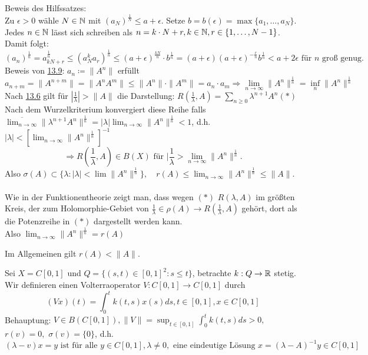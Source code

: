 \begin{beweis}
	Beweis des Hilfssatzes: \\
	Zu $\epsilon > 0$ wähle $N \in \mathbb{N}$ mit $(a_{N})^{\frac{1}{N}} \leq a + \epsilon$. Setze $b = b(\epsilon) = \max \{ a_{1}, \dotsc, a_{N} \}$. \\
	Jedes $n \in \mathbb{N}$ lässt sich schreiben als $n = k \cdot N + r, k \in \mathbb{N}, r \in \{ 1, \dotsc, N - 1 \}$. \\
	Damit folgt:
		\[ (a_{n})^{\frac{1}{n}} = a_{k N + r}^{\frac{1}{n}} \leq (a_{N}^{k} a_{r})^{\frac{1}{n}} \leq (a + \epsilon)^{\frac{k N}{n}} \cdot b^{\frac{1}{n}} = (a + \epsilon)(a + \epsilon)^{- \frac{r}{n}} b^{\frac{1}{n}} < a + 2 \epsilon \text{ für } n \text{ gro{\ss} genug.} \]
	Beweis von \hyperref[satz:13.9]{13.9}: $a_{n} \coloneqq \| A^{n} \|$ erfüllt
	 \[ a_{n + m} = \| A^{n + m} \| = \| A^{n} A^{m} \| \leq \|A^{n}\| \cdot \|A^{m}\| = a_{n} \cdot a_{m} \Rightarrow \lim_{n \rightarrow \infty} \| A^{n} \|^{\frac{1}{n}} = \inf_{n} \| A^{n} \|^{\frac{1}{n}} \]
	Nach \hyperref[satz:13.6]{13.6} gilt für $\left| \frac{1}{\lambda} \right| > \| A \|$ die Darstellung: $R(\frac{1}{\lambda}, A) = \sum_{n \geq 0} \lambda^{n +1} A^{n} (*) \label{eq:13.9.5-*}$ \\ 
	Nach dem Wurzelkriterium konvergiert diese Reihe falls $\overline{\lim_{n \rightarrow \infty}} \| \lambda^{n + 1} A^{n} \|^{\frac{1}{n}} = |\lambda| \lim_{n \rightarrow \infty} \| A^{n} \|^{\frac{1}{n}} < 1$, d.h. $| \lambda | < \left[ \lim_{n \rightarrow \infty} \| A^{n} \|^{\frac{1}{n}} \right]^{-1}$
	\[ \Rightarrow R( \frac{1}{\lambda}, A) \in B(X) \text{ für } |\frac{1}{\lambda} > \lim_{n \rightarrow \infty} \| A^{n} \|^{\frac{1}{n}}. \]
	Also $\sigma(A) \subset \{ \lambda: |\lambda| < \lim \| A^{n} \|^{\frac{1}{n}} \}, \quad r(A) \leq \lim_{n \rightarrow \infty} \| A^{n} \|^{\frac{1}{n}} \leq \|A\|$. \\ \\
	Wie in der Funktionentheorie zeigt man, dass wegen \hyperref[eq:13.9.5-*]{$(*)$} $R(\lambda, A)$ im grö{\ss}ten Kreis, der zum Holomorphie-Gebiet von $\frac{1}{\lambda} \in \rho(A) \rightarrow R(\frac{1}{\lambda}, A)$ gehört, dort als die Potenzreihe in \hyperref[eq:13.9.5-*]{$(*)$} dargestellt werden kann. \\
	Also $\lim_{n \rightarrow \infty} \|A^{n} \|^{\frac{1}{n}} = r(A)$
\end{beweis}

Im Allgemeinen gilt $r(A) < \| A \|$.


\begin{beispiel} \label{bsp:13.10}
	Sei $X = C[0, 1]$ und  $Q = \{ (s, t) \in [0, 1]^{2}: s \leq t \}$, betrachte $k: Q \rightarrow \mathbb{R}$ stetig.  \\
	Wir definieren einen Volterraoperator $V: C[0, 1] \rightarrow C[0, 1]$ durch 
		\[ (V x)(t) = \int_{0}^{t} k(t, s) x(s) ds, t \in [0, 1], x \in C[0, 1] \]
	Behauptung: $V \in B(C[0, 1]), \| V \| = \sup_{t \in [0, 1]} \int_{0}^{t} k(t, s) ds > 0,$ $r(v) = 0,$ $\sigma(v) = \{ 0 \}$, d.h. \\
	\[ (\lambda - v)x = y \text{ ist für alle } y \in C[0, 1], \lambda \neq 0, \text{ eine eindeutige Lösung } x = (\lambda - A)^{-1} y \in C[0, 1] \]
\end{beispiel}

